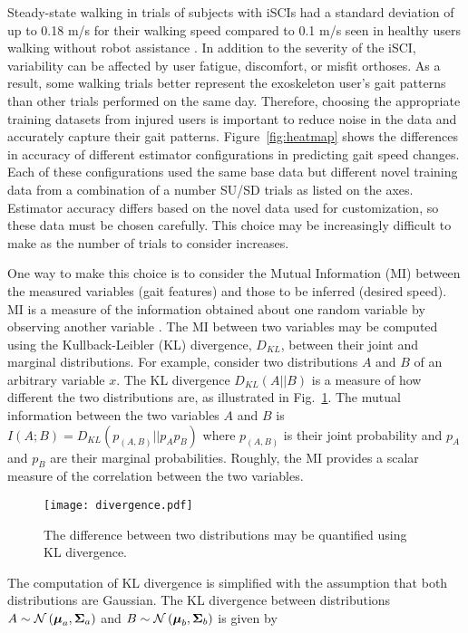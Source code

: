 Steady-state walking in trials of subjects with iSCIs had a standard deviation of up to 0.18 m/s for their walking speed compared to 0.1 m/s seen in healthy users walking without robot assistance \cite{socie2013gait}. In addition to the severity of the iSCI, variability can be affected by user fatigue, discomfort, or misfit orthoses. As a result, some walking trials better represent the exoskeleton user's gait patterns than other trials performed on the same day. Therefore, choosing the appropriate training datasets from injured users is important to reduce noise in the data and accurately capture their gait patterns. Figure~\ref{fig:heatmap} shows the differences in accuracy of different estimator configurations in predicting gait speed changes. Each of these configurations used the same base data but different novel training data from a combination of a number SU/SD trials as listed on the axes. Estimator accuracy differs based on the novel data used for customization, so these data must be chosen carefully. This choice may be increasingly difficult to make as the number of trials to consider increases. 

One way to make this choice is to consider the Mutual Information (MI) between the measured variables (gait features) and those to be inferred (desired speed). MI is a measure of the information obtained about one random variable by observing another variable \cite{cover1999elements}. The MI between two variables may be computed using the Kullback-Leibler (KL) divergence, $ D_{KL} $, between their joint and marginal distributions. For example, consider two distributions $ A $ and $ B $ of an arbitrary variable $ x $. The KL divergence $ D_{KL}(A||B) $ is a measure of how different the two distributions are, as illustrated in Fig.~\ref{fig:divergence}. The mutual information between the two variables $ A $ and $ B $ is $ I(A;B) = D_{KL}(p_{(A,B)}||p_A p_B) $ where $ p_{(A,B)} $ is their joint probability and $ p_A $ and $ p_B $ are their marginal probabilities. Roughly, the MI provides a scalar measure of the correlation between the two variables.
%
\begin{figure}
	\centering
	\texttt{[image: divergence.pdf]}
	\caption{The difference between two distributions may be quantified using KL divergence.}\label{fig:divergence}
\end{figure}

The computation of KL divergence is simplified with the assumption that both distributions are Gaussian. The KL divergence between distributions $ A \sim \mathcal{N}\left(\boldsymbol{\mu}_a, \boldsymbol{\Sigma}_a\right) $ and $ B \sim \mathcal{N}\left(\boldsymbol{\mu}_b, \boldsymbol{\Sigma}_b\right) $ is given by

